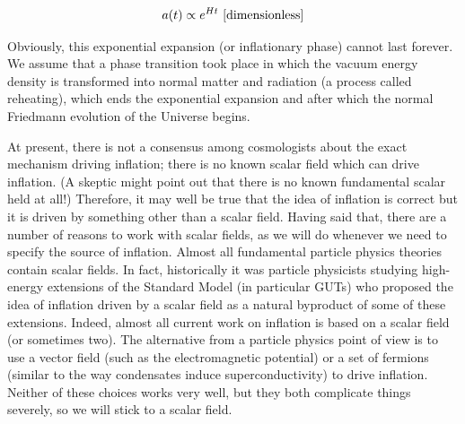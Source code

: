 \documentclass[a4paper,11pt]{article}
\begin{document}
\begin{align*}
    a(t) \propto e^{Ht} ~ [{\rm dimensionless}]
\end{align*}

{\noindent}Obviously, this exponential expansion (or inflationary phase) cannot last forever. We assume that a phase transition took place in which the vacuum energy density is transformed into normal matter and radiation (a process called reheating), which ends the exponential expansion and after which the normal Friedmann evolution of the Universe begins.

{\noindent}At present, there is not a consensus among cosmologists about the exact mechanism driving inflation; there is no known scalar field which can drive inflation. (A skeptic might point out that there is no known fundamental scalar held at all!) Therefore, it may well be true that the idea of inflation is correct but it is driven by something other than a scalar field. Having said that, there are a number of reasons to work with scalar fields, as we will do whenever we need to specify the source of inflation. Almost all fundamental particle physics theories contain scalar fields. In fact, historically it was particle physicists studying high-energy extensions of the Standard Model (in particular GUTs) who proposed the idea of inflation driven by a scalar field as a natural byproduct of some of these extensions. Indeed, almost all current work on inflation is based on a scalar field (or sometimes two). The alternative from a particle physics point of view is to use a vector field (such as the electromagnetic potential) or a set of fermions (similar to the way condensates induce superconductivity) to drive inflation. Neither of these choices works very well, but they both complicate things severely, so we will stick to a scalar field.
\end{document}
